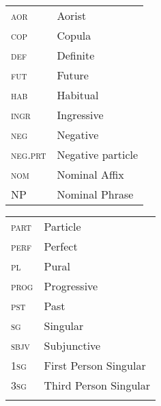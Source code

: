 \documentclass[output=paper,newtxmath,modfonts,nonflat,draftmode]{langsci/langscibook}
\begin{document}
\begin{tabularx}{.45\textwidth}{lQ}
\textsc{aor} & Aorist \\
\textsc{cop} & Copula\\
 \textsc{def}&  Definite\\
 \textsc{fut}&  Future\\
 \textsc{hab}&  Habitual\\
\textsc{ingr}&  Ingressive\\
\textsc{neg}&  Negative \\
\textsc{neg.prt} &  Negative particle\\
 \textsc{nom} & Nominal Affix\\
 NP &  Nominal Phrase\\
\end{tabularx}
\begin{tabularx}{.45\textwidth}{lQ}
 \textsc{part} & Particle\\
 \textsc{perf}&  Perfect\\
 \textsc{pl}&  Pural\\
 \textsc{prog}&  Progressive\\
 \textsc{pst} & Past\\
 \textsc{sg} & Singular\\
 \textsc{sbjv} & Subjunctive\\
 1\textsc{sg}&  First Person Singular\\
 3\textsc{sg}&  Third Person Singular\\
 \\
 
\end{tabularx}



\sloppy
\printbibliography[heading=subbibliography,notkeyword=this]
\end{document}
